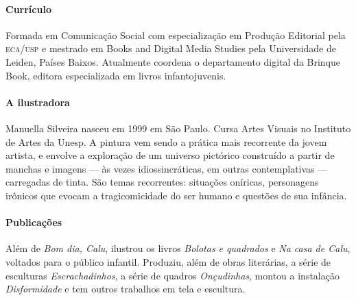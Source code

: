\documentclass[11pt]{extarticle}
\begin{document}
\paragraph{Currículo} 
Formada em Comunicação Social com 
especialização em Produção Editorial pela \textsc{eca/usp} 
e mestrado em Books and Digital Media Studies pela 
Universidade de Leiden, Países Baixos.
Atualmente coordena o departamento digital da Brinque 
Book, editora especializada em livros infantojuvenis.


\paragraph{A ilustradora}
Manuella Silveira nasceu em 1999 em São Paulo. Cursa Artes Visuais no Instituto de Artes da Unesp. A pintura vem sendo a prática mais recorrente da jovem artista, e envolve a exploração de um universo pictórico construído a partir de manchas e imagens --- às vezes idiossincráticas, em outras contemplativas --- carregadas de tinta. São temas recorrentes: situações oníricas, personagens irônicos que evocam a tragicomicidade do ser humano e questões de sua infância.


\paragraph{Publicações}
Além de \textit{Bom dia, Calu}, ilustrou os livros \emph{Bolotas e quadrados} e \emph{Na casa de Calu}, voltados para o público infantil. Produziu, além de obras literárias, a série de esculturas \textit{Escrachadinhos}, a série de quadros \textit{Onçudinhas}, montou a instalação \textit{Disformidade} e tem outros trabalhos em tela e escultura.


\end{document}
